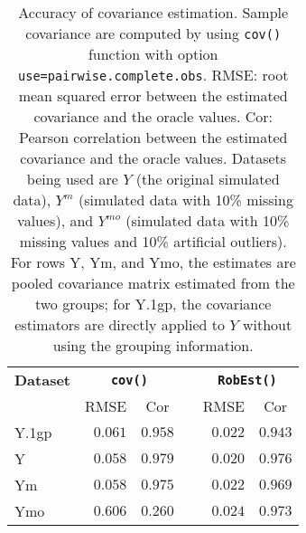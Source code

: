 \begin{table}[!tbp]
\caption{Accuracy of covariance estimation. Sample covariance are computed by using \texttt{cov()} function with option \texttt{use=pairwise.complete.obs}. RMSE: root mean squared error between the estimated covariance and the oracle values. Cor: Pearson correlation between the estimated covariance and the oracle values. Datasets being used are $Y$ (the original simulated data), $Y^{m}$ (simulated data with 10\% missing values), and $Y^{mo}$ (simulated data with 10\% missing values and 10\% artificial outliers). For rows Y, Ym, and Ymo, the estimates are pooled covariance matrix estimated from the two groups; for Y.1gp, the covariance estimators are directly applied to $Y$ without using the grouping information.\label{tab:sim1-est}} 
\begin{center}
\begin{tabular}{lrrcrr}
\hline\hline
\multicolumn{1}{l}{\bfseries Dataset}&\multicolumn{2}{c}{\bfseries \texttt{cov()}}&\multicolumn{1}{c}{\bfseries }&\multicolumn{2}{c}{\bfseries \texttt{RobEst()}}\tabularnewline
\cline{2-3} \cline{5-6}
\multicolumn{1}{l}{}&\multicolumn{1}{c}{RMSE}&\multicolumn{1}{c}{Cor}&\multicolumn{1}{c}{}&\multicolumn{1}{c}{RMSE}&\multicolumn{1}{c}{Cor}\tabularnewline
\hline
Y.1gp&$0.061$&$0.958$&&$0.022$&$0.943$\tabularnewline
Y&$0.058$&$0.979$&&$0.020$&$0.976$\tabularnewline
Ym&$0.058$&$0.975$&&$0.022$&$0.969$\tabularnewline
Ymo&$0.606$&$0.260$&&$0.024$&$0.973$\tabularnewline
\hline
\end{tabular}\end{center}
\end{table}
